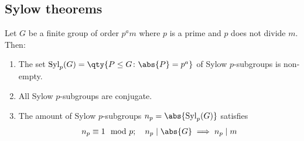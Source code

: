 \subsection{Sylow theorems}
\begin{theorem}
	Let $G$ be a finite group of order $p^a m$ where $p$ is a prime and $p$ does not divide $m$.
	Then:
	\begin{enumerate}
		\item The set $\mathrm{Syl}_p(G) = \qty{P \leq G \colon \abs{P} = p^a}$ of Sylow $p$-subgroups is non-empty.
		\item All Sylow $p$-subgroups are conjugate.
		\item The amount of Sylow $p$-subgroups $n_p = \abs{\mathrm{Syl}_p(G)}$ satisfies
		      \begin{align*}
			      n_p \equiv 1 \mod p;\quad n_p \mid \abs{G} \implies n_p \mid m
		      \end{align*}
	\end{enumerate}
\end{theorem}
